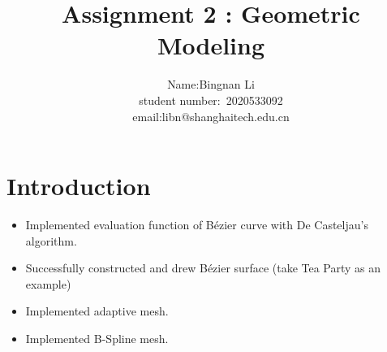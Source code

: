 \documentclass[acmtog]{acmart}
\title{{Assignment 2 : Geometric Modeling}}
\author{Name:\quad Bingnan Li\\ student number:\ 2020533092
\\email:\quad libn@shanghaitech.edu.cn}
\begin{document}
\maketitle

\vspace*{2 ex}
\setlength\parindent{2em}
\section{Introduction}
\begin{itemize}
\item Implemented evaluation function of Bézier curve with De Casteljau's algorithm.
\item Successfully constructed and drew Bézier surface (take Tea Party as an example)
\item Implemented adaptive mesh.
\item Implemented B-Spline mesh.
\end{itemize}
\end{document}
